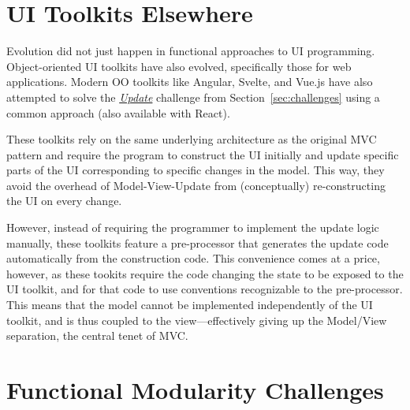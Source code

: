 \documentclass[sigplan,screen]{acmart}
\begin{document}
\section{UI Toolkits Elsewhere}
\label{sec:ui-toolkits-elsewhere}

Evolution did not just happen in functional approaches to UI
programming.  Object-oriented UI toolkits have also evolved,
specifically those for web applications.  Modern OO toolkits like
Angular, Svelte, and Vue.js have also attempted to solve the \hyperlink{challenge:update}{\textit{Update}} challenge
from Section~\ref{sec:challenges} using a common approach (also
available with React).

These toolkits rely on the same underlying architecture as the
original MVC pattern and require the program to construct the UI
initially and update specific parts of the UI corresponding to
specific changes in the model.  This way, they avoid the overhead of
Model-View-Update from (conceptually) re-constructing the UI on every
change.

However, instead of requiring the programmer to implement the update
logic manually, these toolkits feature a pre-processor 
that generates the update code automatically from the construction code.
This convenience comes at a price, however, as these tookits require
the code changing the state to be exposed to the UI toolkit, and for
that code to use conventions recognizable to the pre-processor.  This
means that the model cannot be implemented independently of the UI
toolkit, and is thus coupled to the view---effectively giving up the
Model/View separation, the central tenet of MVC.

\section{Functional Modularity Challenges}
\label{sec:modularity-challenges}
\end{document}
